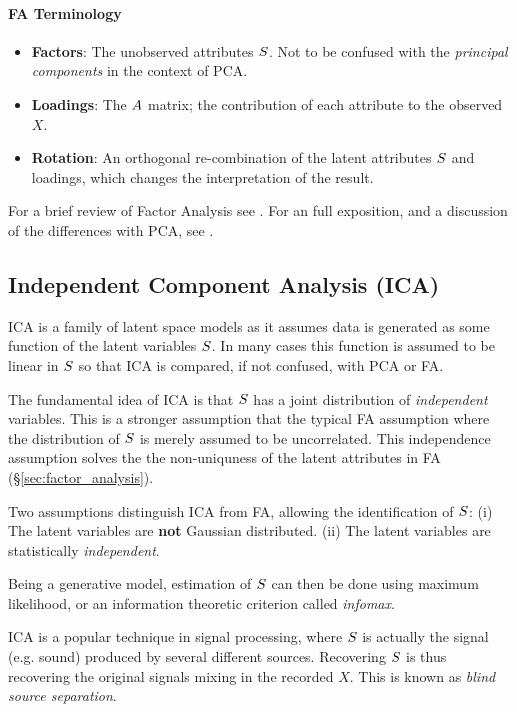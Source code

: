 \paragraph{FA Terminology}
\begin{itemize}
\item \textbf{Factors}: The unobserved attributes $S$. Not to be confused with the \emph{principal components} in the context of PCA.
\item \textbf{Loadings}: The $A$ matrix; the contribution of each attribute to the observed $X$.
\item \textbf{Rotation}: An orthogonal re-combination of the latent attributes $S$ and loadings, which changes the interpretation of the result.
\end{itemize}


For a brief review of Factor Analysis see \cite{hastie_elements_2003}.
For an full exposition, and a discussion of the differences with PCA, see \cite{jolliffe_principal_2002}.




\subsection{Independent Component Analysis (ICA)}
\label{sec:ica}

ICA is a family of latent space models as it assumes data is generated as some function of the latent variables $S$. 
In many cases this function is assumed to be linear in $S$ so that ICA is compared, if not confused, with PCA or FA. 

The fundamental idea of ICA is that $S$ has a joint distribution of \emph{independent} variables. 
This is a stronger assumption that the typical FA assumption where the distribution of $S$ is merely assumed to be uncorrelated. 
This independence assumption solves the the non-uniquness of the latent attributes in FA (\S\ref{sec:factor_analysis}).

Two assumptions distinguish ICA from FA, allowing the identification of $S$: 
(i) The latent variables are \textbf{not} Gaussian distributed.
(ii) The latent variables are statistically \emph{independent}.

Being a generative model, estimation of $S$ can then be done using maximum likelihood, or an information theoretic criterion called \emph{infomax}.



ICA is a popular technique in signal processing, where $S$ is actually the signal (e.g. sound) produced by several different sources. 
Recovering $S$ is thus recovering the original signals mixing in the recorded $X$. This is known as \emph{blind source separation}.


